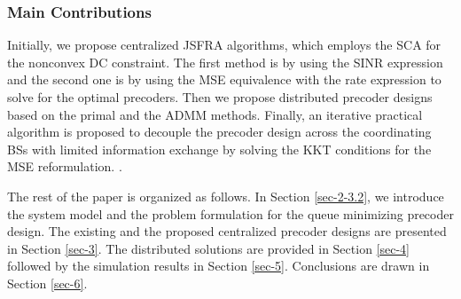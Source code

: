 \subsubsection*{Main Contributions}
 Initially, we propose centralized \ac{JSFRA} algorithms, which employs the \ac{SCA} for the nonconvex \ac{DC} constraint. The first method is by using the \ac{SINR} expression and the second one is by using the \ac{MSE} equivalence with the rate expression to solve for the optimal precoders. Then we propose distributed precoder designs based on the primal and the \ac{ADMM} methods. Finally, an iterative practical algorithm is proposed to decouple the precoder design across the coordinating \acp{BS} with limited information exchange by solving the \ac{KKT} conditions for the \ac{MSE} reformulation. .

The rest of the paper is organized as follows. In Section \ref{sec-2-3.2}, we introduce the system model and the problem formulation for the queue minimizing precoder design. The existing and the proposed centralized precoder designs are presented in Section \ref{sec-3}. The distributed solutions are provided in Section \ref{sec-4} followed by the simulation results in Section \ref{sec-5}. Conclusions are drawn in Section \ref{sec-6}.
